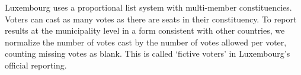 Luxembourg uses a proportional list system with multi-member constituencies.
Voters can cast as many votes as there are seats in their constituency.
To report results at the municipality level in a form consistent with other countries, 
we normalize the number of votes cast by the number of votes allowed per voter, counting
missing votes as blank. This is called `fictive voters' in Luxembourg's official reporting.